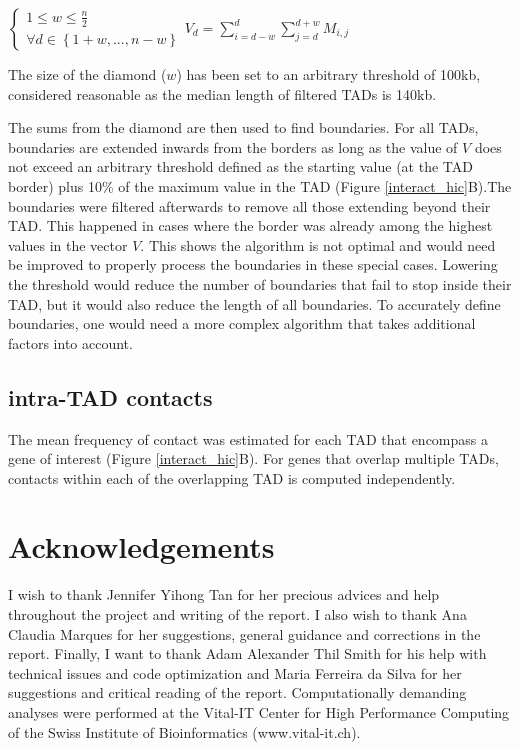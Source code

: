 \documentclass[11pt,a4paper]{report}
\begin{document}
\vspace{0.2in}
$\left\{\begin{matrix}1\leq w\leq \frac{n}{2} \\ \forall d\in\left \{ 1+w , ... , n-w \right \}\end{matrix}\right. V_{d}=\sum_{i=d-w}^{d}\sum_{j=d}^{d+w}M_{i,j}$
\vspace{0.2in}

\noindent The size of the diamond ($w$) has been set to an arbitrary threshold of 100kb, considered reasonable as the median length of filtered TADs is 140kb.

The sums from the diamond are then used to find boundaries. For all TADs, boundaries are extended inwards from the borders as long as the value of $V$ does not exceed an arbitrary threshold defined as the starting value (at the TAD border) plus 10\% of the maximum value in the TAD (Figure \ref{interact_hic}B).The boundaries were filtered afterwards to remove all those extending beyond their TAD. This happened in cases where the border was already among the highest values in the vector $V$. This shows the algorithm is not optimal and would need be improved to properly process the boundaries in these special cases. Lowering the threshold would reduce the number of boundaries that fail to stop inside their TAD, but it would also reduce the length of all boundaries. To accurately define boundaries, one would need a more complex algorithm that takes additional factors into account.

\subsection*{intra-TAD contacts}

The mean frequency of contact was estimated for each TAD that encompass a gene of interest (Figure \ref{interact_hic}B). For genes that overlap multiple TADs, contacts within each of the overlapping TAD is computed independently.

\section*{Acknowledgements}
I wish to thank Jennifer Yihong Tan for her precious advices and help throughout the project and writing of the report. I also wish to thank Ana Claudia Marques for her suggestions, general guidance and corrections in the report. Finally, I want to thank Adam Alexander Thil Smith for  his help with technical issues and code optimization and Maria Ferreira da Silva for her suggestions and critical reading of the report.
Computationally demanding analyses were performed at the Vital-IT Center for High Performance Computing of the Swiss Institute of Bioinformatics (www.vital-it.ch).


\fancyhead[L]{\slshape }

\end{document}
